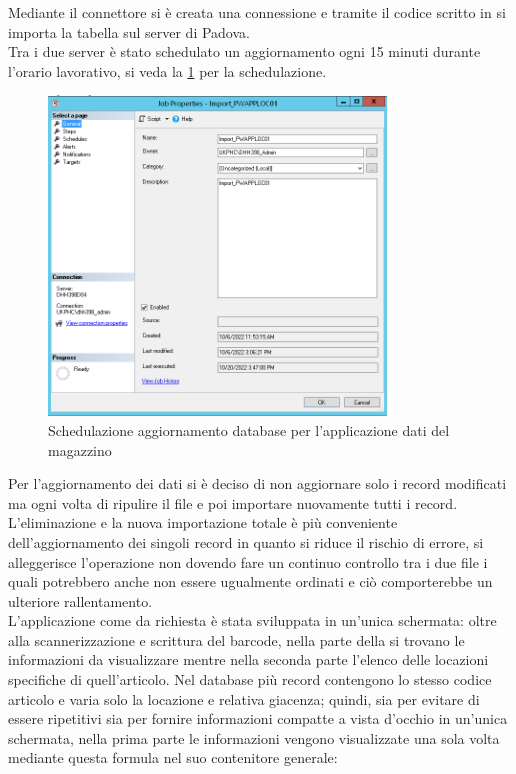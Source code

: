 Mediante il connettore  si è creata una connessione  e tramite il codice scritto in  si importa la tabella sul server di Padova.\\
Tra i due server è stato schedulato un aggiornamento ogni 15 minuti durante l’orario lavorativo, si veda la \figurename \space \ref*{fig:M-Schedulazione} per la schedulazione.
\begin{figure}[H]
    \centering\includegraphics[width=0.8\textwidth, height=0.8\textheight,keepaspectratio]{immagini/M-schedulazione.png}
    \caption{Schedulazione aggiornamento database per l'applicazione dati del magazzino}
    \label{fig:M-Schedulazione}
\end{figure}
Per l’aggiornamento dei dati si è deciso di non aggiornare solo i record modificati ma ogni volta di ripulire il file e poi importare nuovamente tutti i record.
L’eliminazione e la nuova importazione totale è più conveniente dell’aggiornamento dei singoli record in quanto si riduce il rischio di errore, si alleggerisce l’operazione non dovendo fare un continuo controllo tra i due file i quali potrebbero anche non essere ugualmente ordinati e ciò comporterebbe un ulteriore rallentamento.\\
L’applicazione come da richiesta è stata sviluppata in un’unica schermata: oltre alla scannerizzazione e scrittura del barcode, nella parte della si trovano le informazioni da visualizzare mentre nella seconda parte l’elenco delle locazioni specifiche di quell’articolo.
Nel database più record contengono lo stesso codice articolo e varia solo la locazione e relativa giacenza; quindi, sia per evitare di essere ripetitivi sia per fornire informazioni compatte a vista d’occhio in un’unica schermata, nella prima parte le informazioni vengono visualizzate una sola volta mediante questa formula nel suo contenitore generale:\\

